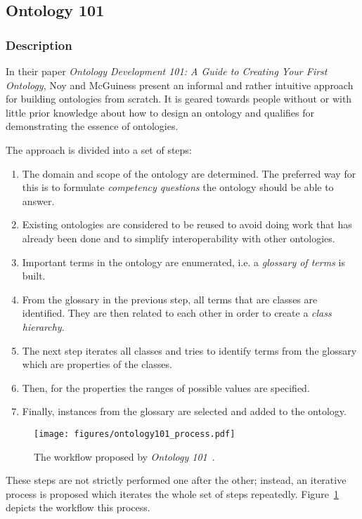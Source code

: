 \subsection{Ontology 101}
\label{subsec:approach1}

\subsubsection{Description}

In their paper \emph{Ontology Development 101: A Guide to Creating Your First Ontology}\cite{Ontology101}, Noy and McGuiness present an informal and rather intuitive approach for building ontologies from scratch. It is geared towards people without or with little prior knowledge about how to design an ontology and qualifies for demonstrating the essence of ontologies.

The approach is divided into a set of steps:
\begin{enumerate}
  \item The domain and scope of the ontology are determined. The preferred way for this is to formulate \emph{competency questions} the ontology should be able to answer.
  \item Existing ontologies are considered to be reused to avoid doing work that has already been done and to simplify interoperability with other ontologies.
  \item Important terms in the ontology are enumerated, i.e. a \emph{glossary of terms} is built.
  \item From the glossary in the previous step, all terms that are classes are identified. They are then related to each other in order to create a \emph{class hierarchy}.
  \item The next step iterates all classes and tries to identify terms from the glossary which are properties of the classes.
  \item Then, for the properties the ranges of possible values are specified.
  \item Finally, instances from the glossary are selected and added to the ontology.
\end{enumerate}

\begin{figure}
\centering
\texttt{[image: figures/ontology101\_process.pdf]}
\caption{The workflow proposed by \emph{Ontology 101}~\cite{Ontology101}.}
\label{fig:ontology101_process}
\end{figure}

These steps are not strictly performed one after the other; instead, an iterative process is proposed which iterates the whole set of steps repeatedly. Figure~\ref{fig:ontology101_process} depicts the workflow this process.

